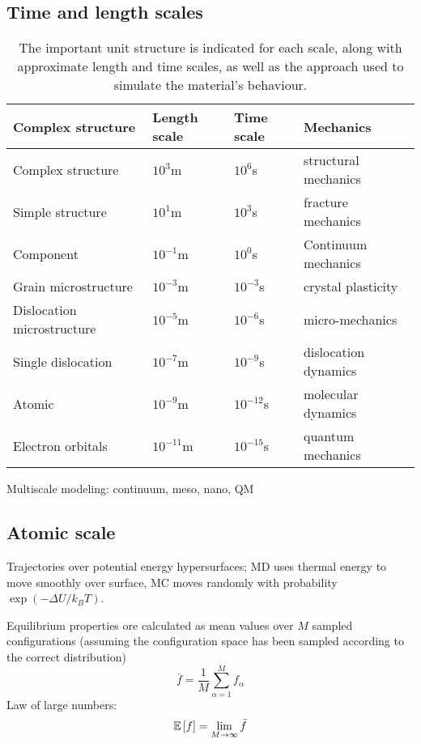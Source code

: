 \documentclass{report}
\begin{document}
\subsection{Time and length scales}
\begin{table}
\centering
\begin{tabular}{llll}
\textbf{Complex structure} & \textbf{Length scale} & \textbf{Time scale} & \textbf{Mechanics} \\ \hline
Complex structure & $10^3$m & $10^{6}$s & structural mechanics \\
Simple structure & $10^1$m & $10^3$s & fracture mechanics \\
Component & $10^{-1}$m & $10^0$s & Continuum mechanics \\
Grain microstructure & $10^{-3}$m & $10^{-3}$s & crystal plasticity \\
Dislocation microstructure & $10^{-5}$m & $10^{-6}$s & micro-mechanics \\
Single dislocation & $10^{-7}$m & $10^{-9}$s & dislocation dynamics \\
Atomic & $10^{-9}$m & $10^{-12}$s & molecular dynamics \\
Electron orbitals & $10^{-11}$m & $10^{-15}$s & quantum mechanics
\end{tabular}
\caption{The important unit structure is indicated for each scale, along with approximate length and time scales, as well as the approach used to simulate the material's behaviour.}
\label{tab:timeLength}
\end{table}
Multiscale modeling: continuum, meso, nano, QM

\subsection{Atomic scale}
Trajectories over potential energy hypersurfaces; MD uses thermal energy to move smoothly over surface, MC moves randomly with probability $\exp(-\Delta U / k_BT)$.

Equilibrium properties ore calculated as mean values over $M$ sampled configurations (assuming the configuration space has been sampled according to the correct distribution)
\[ \bar{f} = \frac{1}{M}\sum^M_{\alpha=1}f_\alpha \]
Law of large numbers:
\[ \mathbb{E}\left[f\right] = \lim_{M\to \infty}\bar{f} \]
\end{document}
